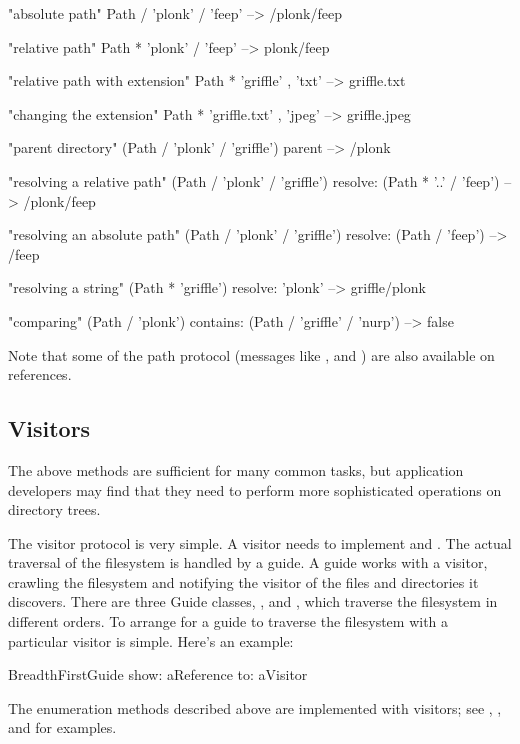 \documentclass[a4paper,10pt,twoside]{book}
\begin{document}
\begin{code}{}
"absolute path"
Path / 'plonk' / 'feep'       --> /plonk/feep
    
"relative path"
Path * 'plonk' / 'feep'       --> plonk/feep

"relative path with extension"
Path * 'griffle' , 'txt'      --> griffle.txt
    
"changing the extension"
Path * 'griffle.txt' , 'jpeg'     --> griffle.jpeg
    
"parent directory"
(Path / 'plonk' / 'griffle') parent   --> /plonk
    
"resolving a relative path"
(Path / 'plonk' / 'griffle') resolve: (Path * '..' / 'feep')
                   --> /plonk/feep
    
"resolving an absolute path"
(Path / 'plonk' / 'griffle') resolve: (Path / 'feep')
                   --> /feep
                                           
"resolving a string"
(Path * 'griffle') resolve: 'plonk'   --> griffle/plonk
                        
"comparing"
(Path / 'plonk') contains: (Path / 'griffle' / 'nurp')
                     --> false
\end{code}

Note that some of the path protocol (messages like \ct{/},  and ) are also available on references.





 


\subsection{Visitors}

The above methods are sufficient for many common tasks, but application developers may find that they need to perform more sophisticated operations on directory trees.

The visitor protocol is very simple. A visitor needs to implement  and . The actual traversal of the filesystem is handled by a guide. A guide works with a visitor, crawling the filesystem and notifying the visitor of the files and directories it discovers. There are three Guide classes, ,  and  , which traverse the filesystem in different orders. To arrange for a guide to traverse the filesystem with a particular visitor is simple. Here's an example:

\begin{code}{}
    BreadthFirstGuide show: aReference to: aVisitor
\end{code}	

The enumeration methods described above are implemented with visitors; see , , and  for examples.


\ifx\wholebook\relax\else
   
   
\end{document}
